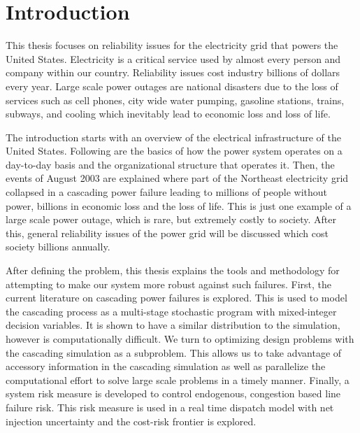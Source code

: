 \newcommand{\mypath}{../thesis}
\newcommand{\mypathintro}{../thesis/intro}
\chapter{Introduction}
This thesis focuses on reliability issues for the electricity grid that powers the United States.  Electricity is a critical service used by almost every person and company within our country.  Reliability issues cost industry billions of dollars every year.  Large scale power outages are national disasters due to the loss of services such as cell phones, city wide water pumping, gasoline stations, trains, subways, and cooling which inevitably lead to economic loss and loss of life.  

The introduction starts with an overview of the electrical infrastructure of the United States.  Following are the basics of how the power system operates on a day-to-day basis and the organizational structure that operates it. Then, the events of August 2003 are explained where part of the Northeast electricity grid collapsed in a cascading power failure leading to millions of people without power, billions in economic loss and the loss of life.  This is just one example of a large scale power outage, which is rare, but extremely costly to society. After this, general reliability issues of the power grid will be discussed which cost society billions annually.
 
After defining the problem, this thesis explains the tools and methodology for attempting to make our system more robust against such failures.  First, the current literature on cascading power failures is explored.  This is used to model the cascading process as a multi-stage stochastic program with mixed-integer decision variables.  It is shown to have a similar distribution to the simulation, however is computationally difficult.  We turn to optimizing design problems with the cascading simulation as a subproblem.  This allows us to take advantage of accessory information in the cascading simulation as well as parallelize the computational effort to solve large scale problems in  a timely manner.  Finally, a system risk measure is developed to control endogenous, congestion based line failure risk.  This risk measure is used in a real time dispatch model with net injection uncertainty and the cost-risk frontier is explored.


